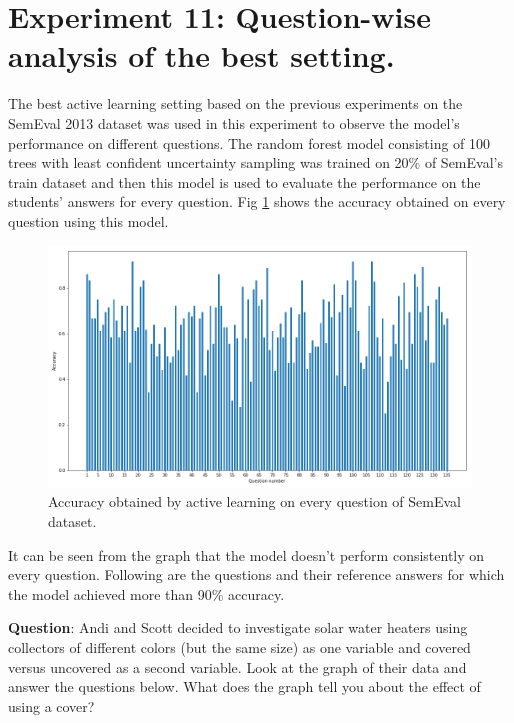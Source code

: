 	
\clearpage

\section{Experiment 11: Question-wise analysis of the best setting.}

The best active learning setting based on the previous experiments on the SemEval 2013 dataset was used in this experiment to observe the model's performance on different questions. The random forest model consisting of 100 trees with least confident uncertainty sampling was trained on 20\% of SemEval's train dataset and then this model is used to evaluate the performance on the students' answers for every question. Fig \ref{sem_ques} shows the accuracy obtained on every question using this model.

 \begin{figure}[!htb]
	\centering
	\includegraphics[scale=0.41]{images/sem_ques}
	\caption{Accuracy obtained by active learning on every question of SemEval dataset.}
	\label{sem_ques}
\end{figure}

It can be seen from the graph that the model doesn't perform consistently on every question. Following are the questions and their reference answers for which the model achieved more than 90\% accuracy. 

\noindent \textbf{Question}: Andi and Scott decided to investigate solar water heaters using collectors of different colors (but the same size) as one variable and covered versus uncovered as a second variable. Look at the graph of their data and answer the questions below. What does the graph tell you about the effect of using a cover?

